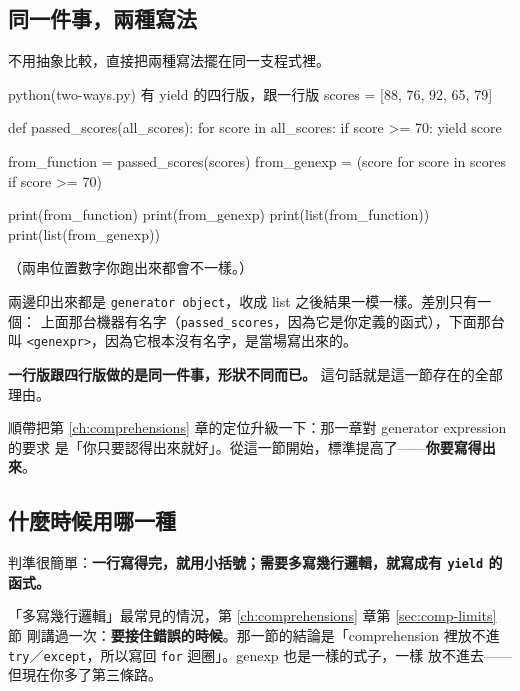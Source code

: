 \subsection*{同一件事，兩種寫法}

不用抽象比較，直接把兩種寫法擺在同一支程式裡。

\begin{example}{python}{(two-ways.py) 有 yield 的四行版，跟一行版}
scores = [88, 76, 92, 65, 79]


def passed_scores(all_scores):
    for score in all_scores:
        if score >= 70:
            yield score


from_function = passed_scores(scores)
from_genexp = (score for score in scores if score >= 70)

print(from_function)
print(from_genexp)
print(list(from_function))
print(list(from_genexp))
\end{example}


（兩串位置數字你跑出來都會不一樣。）

兩邊印出來都是 \texttt{generator object}，收成 list 之後結果一模一樣。差別只有一個：
上面那台機器有名字（\texttt{passed\_scores}，因為它是你定義的函式），下面那台叫
\texttt{<genexpr>}，因為它根本沒有名字，是當場寫出來的。

\textbf{一行版跟四行版做的是同一件事，形狀不同而已。} 這句話就是這一節存在的全部理由。

順帶把第 \ref{ch:comprehensions} 章的定位升級一下：那一章對 generator expression 的要求
是「你只要認得出來就好」。從這一節開始，標準提高了——\textbf{你要寫得出來}。

\subsection*{什麼時候用哪一種}

判準很簡單：\textbf{一行寫得完，就用小括號；需要多寫幾行邏輯，就寫成有 \texttt{yield}
的函式。}

「多寫幾行邏輯」最常見的情況，第 \ref{ch:comprehensions} 章第 \ref{sec:comp-limits} 節
剛講過一次：\textbf{要接住錯誤的時候}。那一節的結論是「comprehension 裡放不進
\texttt{try}／\texttt{except}，所以寫回 \texttt{for} 迴圈」。genexp 也是一樣的式子，一樣
放不進去——但現在你多了第三條路。

